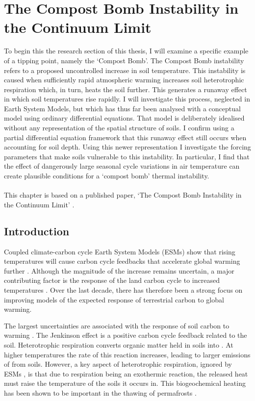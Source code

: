 \chapter{The Compost Bomb Instability in the Continuum Limit}
\label{chapter:continuous_compost_bomb}
\graphicspath{{continuous_compost_bomb/figs/}}

To begin this the research section of this thesis, I will examine a specific example of a tipping point, namely the `Compost Bomb'. The
Compost Bomb instability refers to a proposed uncontrolled increase in soil temperature. This instability is caused when sufficiently rapid
atmospheric warming increases soil heterotrophic respiration which, in turn, heats the soil further. This generates a runaway
effect in which soil temperatures rise rapidly. I will investigate this process, neglected in Earth System Models, but which has thus far been analysed with a conceptual
model using ordinary differential equations. That model is deliberately idealised without any representation of the spatial structure of soils.
I confirm using a partial differential equation framework that this runaway effect still occurs when accounting for soil depth.
Using this newer representation I investigate the forcing parameters that make soils vulnerable to this instability. In particular, I find that the effect of
dangerously large seasonal cycle variations in air temperature can create plausible conditions for a `compost bomb' thermal instability.
\\\\
This chapter is based on a published paper, `The Compost Bomb Instability in the Continuum Limit' \parencite{Clarke2021}.

 \section{Introduction}
\label{section:compost_bomb_intro}
Coupled climate-carbon cycle Earth System Models (ESMs) show that rising temperatures will cause carbon cycle feedbacks that accelerate global
warming further \parencite{Cox2000}. Although the magnitude of the increase remains uncertain, a major contributing factor is the
response of the land carbon cycle to increased temperatures \parencite{Friedlingstein2006,Arora2020}. Over the last decade, there has therefore been a strong focus on improving
models of the expected response of terrestrial carbon to global warming.

The largest uncertainties are associated with the response of soil carbon to warming \parencite{Varney2020}.
The Jenkinson effect \parencite{Jenkinson1991} is a positive carbon cycle feedback related to the soil. Heterotrophic respiration converts
organic matter held in soils into . At higher temperatures the rate of this reaction increases, leading to
larger emissions of  from soils. However, a key aspect of heterotrophic respiration, ignored by ESMs \parencite{Arora2020}, is that due to respiration being
an exothermic reaction, the released heat must raise the temperature of the soils it occurs in. This biogeochemical heating has been shown
to be important in the thawing of permafrosts \parencite{Khvorostyanov2008,Khvorostyanov2008a}.


